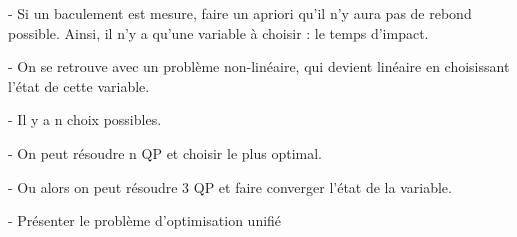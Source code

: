 				- Si un baculement est mesure, faire un apriori qu'il n'y aura pas de rebond possible. Ainsi, il n'y a qu'une variable à choisir : le temps d'impact.

				- On se retrouve avec un problème non-linéaire, qui devient linéaire en choisissant l'état de cette variable.

				- Il y a n choix possibles.

				- On peut résoudre n QP et choisir le plus optimal.

				- Ou alors on peut résoudre 3 QP et faire converger l'état de la variable.

				- Présenter le problème d'optimisation unifié